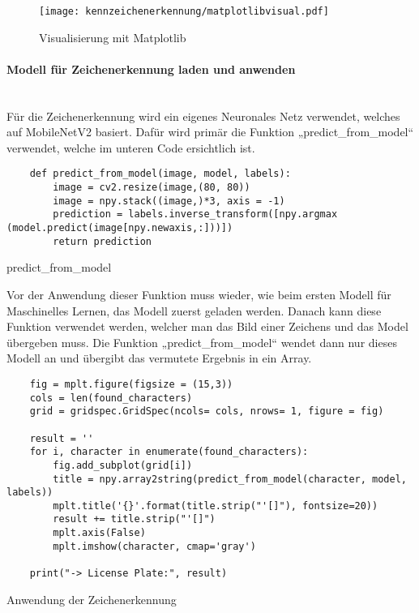 \begin{figure}[H]
    \centering
    \texttt{[image: kennzeichenerkennung/matplotlibvisual.pdf]}
    \caption{Visualisierung mit Matplotlib}
\end{figure}

\paragraph{Modell für Zeichenerkennung laden und anwenden}\mbox{}\\

Für die Zeichenerkennung wird ein eigenes Neuronales Netz verwendet, welches auf MobileNetV2 basiert. Dafür wird primär die Funktion „predict{\_}from{\_}model“ 
verwendet, welche im unteren Code ersichtlich ist.

\begin{listing}[H]
    \begin{verbatim}
    def predict_from_model(image, model, labels):
        image = cv2.resize(image,(80, 80))
        image = npy.stack((image,)*3, axis = -1)
        prediction = labels.inverse_transform([npy.argmax (model.predict(image[npy.newaxis,:]))])
        return prediction
    \end{verbatim}
    \caption{predict{\_}from{\_}model}
\end{listing}

Vor der Anwendung dieser Funktion muss wieder, wie beim ersten Modell für Maschinelles Lernen, das Modell zuerst geladen werden. Danach kann diese Funktion verwendet werden, 
welcher man das Bild einer Zeichens und das Model übergeben muss. Die Funktion „predict{\_}from{\_}model“ wendet dann nur dieses Modell an und übergibt das 
vermutete Ergebnis in ein Array.

\begin{longlisting}
    \begin{verbatim}
    fig = mplt.figure(figsize = (15,3))
    cols = len(found_characters)
    grid = gridspec.GridSpec(ncols= cols, nrows= 1, figure = fig)

    result = ''
    for i, character in enumerate(found_characters):
        fig.add_subplot(grid[i])
        title = npy.array2string(predict_from_model(character, model, labels))
        mplt.title('{}'.format(title.strip("'[]"), fontsize=20))
        result += title.strip("'[]")
        mplt.axis(False)
        mplt.imshow(character, cmap='gray')

    print("-> License Plate:", result)
    \end{verbatim}
    \caption{Anwendung der Zeichenerkennung}
\end{longlisting}

